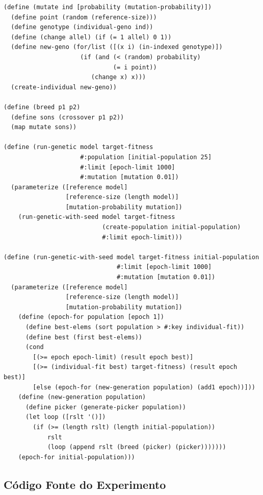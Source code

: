\documentclass{llncs}
\begin{document}
\begin{lstlisting}
(define (mutate ind [probability (mutation-probability)])
  (define point (random (reference-size)))
  (define genotype (individual-geno ind))
  (define (change allel) (if (= 1 allel) 0 1))
  (define new-geno (for/list ([(x i) (in-indexed genotype)])
                     (if (and (< (random) probability)
                              (= i point))
                        (change x) x)))
  (create-individual new-geno))

(define (breed p1 p2)
  (define sons (crossover p1 p2))
  (map mutate sons))

(define (run-genetic model target-fitness
                     #:population [initial-population 25]
                     #:limit [epoch-limit 1000]
                     #:mutation [mutation 0.01])
  (parameterize ([reference model]
                 [reference-size (length model)]
                 [mutation-probability mutation])
    (run-genetic-with-seed model target-fitness
                           (create-population initial-population)
                           #:limit epoch-limit)))

(define (run-genetic-with-seed model target-fitness initial-population
                               #:limit [epoch-limit 1000]
                               #:mutation [mutation 0.01])
  (parameterize ([reference model]
                 [reference-size (length model)]
                 [mutation-probability mutation])
    (define (epoch-for population [epoch 1])
      (define best-elems (sort population > #:key individual-fit))
      (define best (first best-elems))
      (cond
        [(>= epoch epoch-limit) (result epoch best)]
        [(>= (individual-fit best) target-fitness) (result epoch best)]
        [else (epoch-for (new-generation population) (add1 epoch))]))
    (define (new-generation population)
      (define picker (generate-picker population))
      (let loop ([rslt '()])
        (if (>= (length rslt) (length initial-population))
            rslt
            (loop (append rslt (breed (picker) (picker)))))))
    (epoch-for initial-population)))
\end{lstlisting}

\subsection*{Código Fonte do Experimento}
\end{document}
